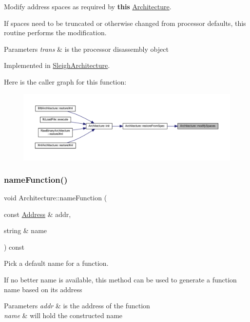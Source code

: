 Modify address spaces as required by {\bfseries{this}} \mbox{\hyperlink{class_architecture}{Architecture}}. 

If spaces need to be truncated or otherwise changed from processor defaults, this routine performs the modification. 
\begin{DoxyParams}{Parameters}
{\em trans} & is the processor disassembly object \\
\hline
\end{DoxyParams}


Implemented in \mbox{\hyperlink{class_sleigh_architecture_aaf0c0ad5b1160d42fecce0a27ce05674}{Sleigh\+Architecture}}.

Here is the caller graph for this function\+:
\nopagebreak
\begin{figure}[H]
\begin{center}
\leavevmode
\includegraphics[width=350pt]{class_architecture_aec1784d8729ba0f13cd7ea63ee546995_icgraph}
\end{center}
\end{figure}
\mbox{\label{class_architecture_a7bd655cd2adbd6538883e1771276604e}} 
\subsubsection{\texorpdfstring{nameFunction()}{nameFunction()}}
{\footnotesize\ttfamily void Architecture\+::name\+Function (\begin{DoxyParamCaption}\item[{const \mbox{\hyperlink{class_address}{Address}} \&}]{addr,  }\item[{string \&}]{name }\end{DoxyParamCaption}) const\hspace{0.3cm}{\ttfamily [virtual]}}



Pick a default name for a function. 

If no better name is available, this method can be used to generate a function name based on its address 
\begin{DoxyParams}{Parameters}
{\em addr} & is the address of the function \\
\hline
{\em name} & will hold the constructed name \\
\hline
\end{DoxyParams}


